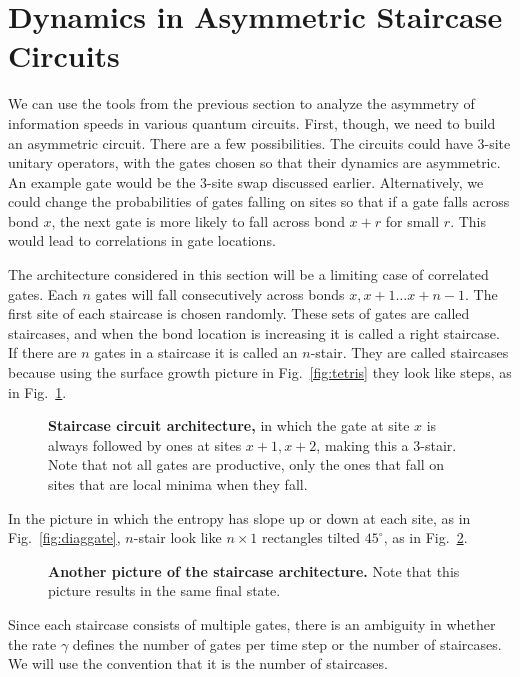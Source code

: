 \section{Dynamics in Asymmetric Staircase Circuits} \label{sec:stairs}

We can use the tools from the previous section to analyze the asymmetry of information speeds in various quantum circuits. First, though, we need to build an asymmetric circuit. There are a few possibilities. The circuits could have 3-site unitary operators, with the gates chosen so that their dynamics are asymmetric. An example gate would be the 3-site swap discussed earlier. Alternatively, we could change the probabilities of gates falling on sites so that if a gate falls across bond $x$, the next gate is more likely to fall across bond $x+r$ for small $r$. This would lead to correlations in gate locations.

The architecture considered in this section will be a limiting case of correlated gates. Each $n$ gates will fall consecutively across bonds $x, x+1\dots x+n-1$. The first site of each staircase is chosen randomly. These sets of gates are called staircases, and when the bond location is increasing it is called a right staircase. If there are $n$ gates in a staircase it is called an $n$-stair. They are called staircases because using the surface growth picture in Fig.~\ref{fig:tetris} they look like steps, as in Fig.~\ref{fig:stairs}. 
\begin{figure}
	\centering
	
	\caption{\textbf{Staircase circuit architecture,} in which the gate at site $x$ is always followed by ones at sites $x+1, x+2$, making this a 3-stair. Note that not all gates are productive, only the ones that fall on sites that are local minima when they fall.}
	\label{fig:stairs}
\end{figure}
In the picture in which the entropy has slope up or down at each site, as in Fig.~\ref{fig:diaggate}, $n$-stair look like $n\times 1$ rectangles tilted $45^\circ$, as in Fig.~\ref{fig:diagstairs}.
\begin{figure}
	\centering
	
	\caption{\textbf{Another picture of the staircase architecture.} Note that this picture results in the same final state.}
	\label{fig:diagstairs}
\end{figure}
Since each staircase consists of multiple gates, there is an ambiguity in whether the rate $\gamma$ defines the number of gates per time step or the number of staircases. We will use the convention that it is the number of staircases.

